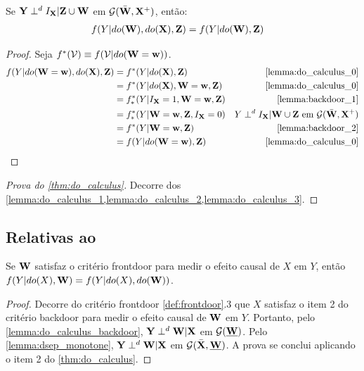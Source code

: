 \begin{lemma}
 \label{lemma:do_calculus_3}
 Se ${\mathbf{Y}} \perp^d I_{{\mathbf{X}}} | {\mathbf{Z}} \cup {\mathbf{W}}$ em ${\mathcal G}(\bar{{\mathbf{W}}}, {\mathbf{X}}^{+})$, então:
 \begin{align*}
  f(Y|do({\mathbf{W}}), do({\mathbf{X}}), {\mathbf{Z}}) &= f(Y|do({\mathbf{W}}), {\mathbf{Z}})
 \end{align*}
\end{lemma}

\begin{proof}
 Seja $f^*({\mathcal V}) \equiv f({\mathcal V}|do({\mathbf{W}}={\mathbf{w}}))$.
 \begin{align*}
  f(Y|do(\W=\w), do(\X), \Z)
  &= f^*(Y|do(\X),\Z) 
  & \text{\cref{lemma:do_calculus_0}} \\
  &= f^*(Y|do(\X),\W=\w,\Z)
  & \text{\cref{lemma:do_calculus_0}} \\ 
  &= f^*_*(Y|I_{\X} = 1, \W=\w, \Z)
  & \text{\cref{lemma:backdoor_1}} \\
  &= f^*_*(Y|\W=\w, \Z, I_{\X}=0)
  & Y \dsep I_{\X} | \W \cup \Z
  \text{ em } \sG(\bar{\W}, \X^{+}) \\
  &= f^*(Y|\W=\w, \Z) 
  & \text{\cref{lemma:backdoor_2}} \\
  &= f(Y|do(\W=\w), \Z)
  & \text{\cref{lemma:do_calculus_0}}
 \end{align*}
\end{proof}

\begin{proof}[Prova do \cref{thm:do_calculus}]
 Decorre dos 
 \cref{lemma:do_calculus_1,lemma:do_calculus_2,lemma:do_calculus_3}.
\end{proof}

\subsection{Relativas ao }

\begin{lemma}
 \label{lemma:frontdoor_1}
 Se ${\mathbf{W}}$ satisfaz o critério frontdoor para
 medir o efeito causal de $X$ em $Y$, então
 $f(Y|do(X),{\mathbf{W}}) = f(Y|do(X),do({\mathbf{W}}))$.
\end{lemma}

\begin{proof}
 Decorre do critério frontdoor \cref{def:frontdoor}.3 que
 $X$ satisfaz o item 2 do critério backdoor para
 medir o efeito causal de ${\mathbf{W}}$ em $Y$.
 Portanto, pelo \cref{lemma:do_calculus_backdoor},
 ${\mathbf{Y}} \perp^d {\mathbf{W}} | {\mathbf{X}}$ em ${\mathcal G}(\underline{{\mathbf{W}}})$.
 Pelo \cref{lemma:dsep_monotone},
 ${\mathbf{Y}} \perp^d {\mathbf{W}} | {\mathbf{X}}$ em ${\mathcal G}(\bar{{\mathbf{X}}}, \underline{{\mathbf{W}}})$.
 A prova se conclui aplicando o item 2
 do \cref{thm:do_calculus}.
\end{proof}

